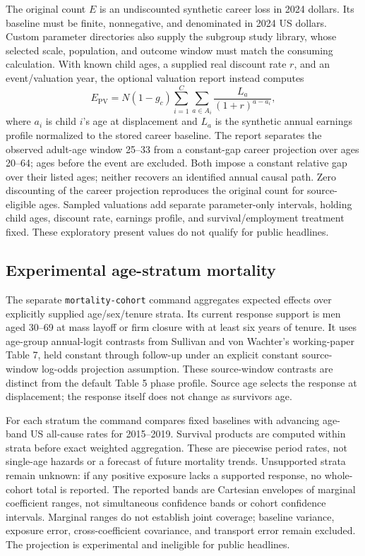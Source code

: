 \documentclass[10pt]{article}
\begin{document}
The original count $E$ is an undiscounted synthetic career loss in 2024
dollars. Its baseline must be finite, nonnegative, and denominated in 2024
US dollars. Custom parameter directories also supply the subgroup study
library, whose selected scale, population, and outcome window must match
the consuming calculation. With known child ages, a supplied real discount rate $r$, and an
event/valuation year, the optional valuation report instead computes
\begin{equation}
 E_{\mathrm{PV}}=N(1-g_c)\sum_{i=1}^{C}\sum_{a\in A_i}
       \frac{L_a}{(1+r)^{a-a_i}},
\end{equation}
where $a_i$ is child $i$'s age at displacement and $L_a$ is the synthetic
annual earnings profile normalized to the stored career baseline.
The report separates the observed adult-age window 25--33 from a
constant-gap career projection over ages 20--64; ages before the event
are excluded. Both impose a constant relative gap over their listed ages;
neither recovers an identified annual causal path. Zero discounting of the
career projection reproduces the original count for source-eligible ages.
Sampled valuations add separate parameter-only intervals, holding child
ages, discount rate, earnings profile, and survival/employment treatment
fixed. These exploratory present values do not qualify for public headlines.

\subsection{Experimental age-stratum mortality}
The separate \texttt{mortality-cohort} command aggregates expected effects
over explicitly supplied age/sex/tenure strata. Its current response
support is men aged 30--69 at mass layoff or firm closure with at least six
years of tenure. It uses age-group annual-logit contrasts from Sullivan
and von Wachter's working-paper Table 7, held constant through follow-up
under an explicit constant source-window log-odds projection assumption.
These source-window contrasts are distinct from the default
Table 5 phase profile. Source age selects the response at displacement;
the response itself does not change as survivors age.

For each stratum the command compares fixed baselines with advancing
age-band US all-cause rates for 2015--2019. Survival products are computed
within strata before exact weighted aggregation. These are piecewise
period rates, not single-age hazards or a forecast of future mortality
trends. Unsupported strata remain unknown: if any positive exposure lacks
a supported response, no whole-cohort total is reported. The reported
bands are Cartesian envelopes of marginal coefficient ranges, not
simultaneous confidence bands or cohort confidence intervals. Marginal
ranges do not establish joint coverage; baseline variance, exposure error, cross-coefficient
covariance, and transport error remain excluded. The projection is
experimental and ineligible for public headlines.
\end{document}

